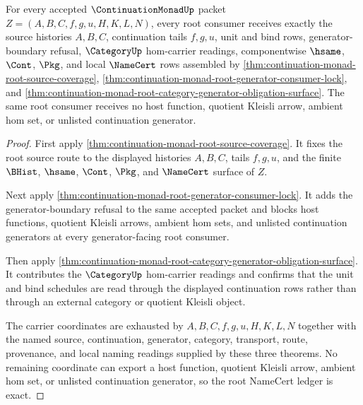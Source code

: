 \begin{theorem}
\label{thm:continuation-monad-root-namecert-ledger-exactness}
For every accepted $\ContinuationMonadUp$ packet $Z=(A,B,C,f,g,u,H,K,L,N)$, every root consumer receives exactly the source histories $A,B,C$, continuation tails $f,g,u$, unit and bind rows, generator-boundary refusal, $\CategoryUp$ hom-carrier readings, componentwise $\hsame$, $\Cont$, $\Pkg$, and local $\NameCert$ rows assembled by \autoref{thm:continuation-monad-root-source-coverage}, \autoref{thm:continuation-monad-root-generator-consumer-lock}, and \autoref{thm:continuation-monad-root-category-generator-obligation-surface}. The same root consumer receives no host function, quotient Kleisli arrow, ambient hom set, or unlisted continuation generator.
\end{theorem}
\begin{proof}
First apply \autoref{thm:continuation-monad-root-source-coverage}. It fixes the root source route to the displayed histories $A,B,C$, tails $f,g,u$, and the finite $\BHist$, $\hsame$, $\Cont$, $\Pkg$, and $\NameCert$ surface of $Z$.

Next apply \autoref{thm:continuation-monad-root-generator-consumer-lock}. It adds the generator-boundary refusal to the same accepted packet and blocks host functions, quotient Kleisli arrows, ambient hom sets, and unlisted continuation generators at every generator-facing root consumer.

Then apply \autoref{thm:continuation-monad-root-category-generator-obligation-surface}. It contributes the $\CategoryUp$ hom-carrier readings and confirms that the unit and bind schedules are read through the displayed continuation rows rather than through an external category or quotient Kleisli object.

The carrier coordinates are exhausted by $A,B,C,f,g,u,H,K,L,N$ together with the named source, continuation, generator, category, transport, route, provenance, and local naming readings supplied by these three theorems. No remaining coordinate can export a host function, quotient Kleisli arrow, ambient hom set, or unlisted continuation generator, so the root NameCert ledger is exact.
\end{proof}

